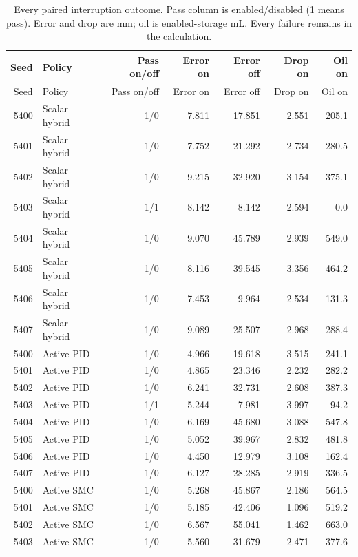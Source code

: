 \begingroup\hypersetup{hypertexnames=true}\small\setlength{\tabcolsep}{4pt}
\begin{longtable}{rlrrrrr}
\caption{Every paired interruption outcome. Pass column is enabled/disabled (1 means pass). Error and drop are mm; oil is enabled-storage mL. Every failure remains in the calculation.}\\\toprule
Seed & Policy & Pass on/off & Error on & Error off & Drop on & Oil on\\\midrule\endfirsthead
\toprule
Seed & Policy & Pass on/off & Error on & Error off & Drop on & Oil on\\\midrule\endhead
5400 & Scalar hybrid & 1/0 & 7.811 & 17.851 & 2.551 & 205.1\\
5401 & Scalar hybrid & 1/0 & 7.752 & 21.292 & 2.734 & 280.5\\
5402 & Scalar hybrid & 1/0 & 9.215 & 32.920 & 3.154 & 375.1\\
5403 & Scalar hybrid & 1/1 & 8.142 & 8.142 & 2.594 & 0.0\\
5404 & Scalar hybrid & 1/0 & 9.070 & 45.789 & 2.939 & 549.0\\
5405 & Scalar hybrid & 1/0 & 8.116 & 39.545 & 3.356 & 464.2\\
5406 & Scalar hybrid & 1/0 & 7.453 & 9.964 & 2.534 & 131.3\\
5407 & Scalar hybrid & 1/0 & 9.089 & 25.507 & 2.968 & 288.4\\
5400 & Active PID & 1/0 & 4.966 & 19.618 & 3.515 & 241.1\\
5401 & Active PID & 1/0 & 4.865 & 23.346 & 2.232 & 282.2\\
5402 & Active PID & 1/0 & 6.241 & 32.731 & 2.608 & 387.3\\
5403 & Active PID & 1/1 & 5.244 & 7.981 & 3.997 & 94.2\\
5404 & Active PID & 1/0 & 6.169 & 45.680 & 3.088 & 547.8\\
5405 & Active PID & 1/0 & 5.052 & 39.967 & 2.832 & 481.8\\
5406 & Active PID & 1/0 & 4.450 & 12.979 & 3.108 & 162.4\\
5407 & Active PID & 1/0 & 6.127 & 28.285 & 2.919 & 336.5\\
5400 & Active SMC & 1/0 & 5.268 & 45.867 & 2.186 & 564.5\\
5401 & Active SMC & 1/0 & 5.185 & 42.406 & 1.096 & 519.2\\
5402 & Active SMC & 1/0 & 6.567 & 55.041 & 1.462 & 663.0\\
5403 & Active SMC & 1/0 & 5.560 & 31.679 & 2.471 & 377.6\\

\end{longtable}
